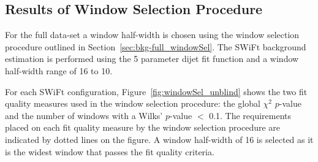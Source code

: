 \vspace{1em}
\subsection{Results of Window Selection Procedure}
\label{sec:bkg-full_windowSelResults}

For the full \lm{} data-set a window half-width is chosen using the window selection procedure outlined in Section~\ref{sec:bkg-full_windowSel}.
The SWiFt background estimation is performed using the 5 parameter dijet fit function and a window half-width range of 16 to 10.

For each SWiFt configuration, Figure~\ref{fig:windowSel_unblind} shows the two fit quality measures used in the window selection procedure:
the global $\chi^2$ $p$-value and the number of windows with a Wilks' $p$-value $<$ 0.1.
The requirements placed on each fit quality measure by the window selection procedure are indicated by dotted lines on the figure.
A window half-width of 16 is selected as it is the widest window that passes the fit quality criteria.

